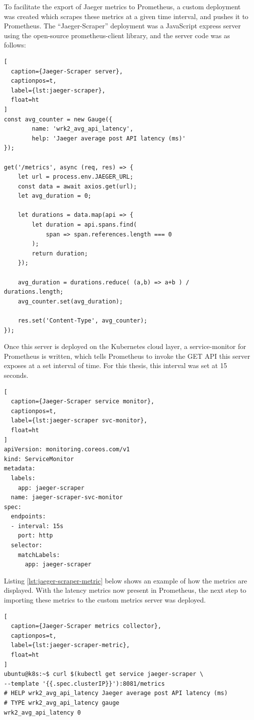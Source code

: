 To facilitate the export of Jaeger metrics to Prometheus, a custom deployment was created which scrapes these metrics at a given time interval, and pushes it to Prometheus. The ``Jaeger-Scraper'' deployment was a JavaScript express server using the open-source prometheus-client library, and the server code was as follows:

\begin{lstlisting}[
  caption={Jaeger-Scraper server},
  captionpos=t,
  label={lst:jaeger-scraper},
  float=ht
]
const avg_counter = new Gauge({
        name: 'wrk2_avg_api_latency',
        help: 'Jaeger average post API latency (ms)'
});

get('/metrics', async (req, res) => {
    let url = process.env.JAEGER_URL;
    const data = await axios.get(url);
    let avg_duration = 0;

    let durations = data.map(api => {
        let duration = api.spans.find(
            span => span.references.length === 0
        );
        return duration;
    });

    avg_duration = durations.reduce( (a,b) => a+b ) / durations.length;
    avg_counter.set(avg_duration);

    res.set('Content-Type', avg_counter);
});
\end{lstlisting}

Once this server is deployed on the Kubernetes cloud layer, a service-monitor for Prometheus is written, which tells Prometheus to invoke the GET API this server exposes at a set interval of time. For this thesis, this interval was set at 15 seconds.

\begin{lstlisting}[
  caption={Jaeger-Scraper service monitor},
  captionpos=t,
  label={lst:jaeger-scraper svc-monitor},
  float=ht
]
apiVersion: monitoring.coreos.com/v1
kind: ServiceMonitor
metadata:
  labels:
    app: jaeger-scraper
  name: jaeger-scraper-svc-monitor
spec:
  endpoints:
  - interval: 15s
    port: http
  selector:
    matchLabels:
      app: jaeger-scraper
\end{lstlisting}

Listing \ref{lst:jaeger-scraper-metric} below shows an example of how the metrics are displayed. With the latency metrics now present in Prometheus, the next step to importing these metrics to the custom metrics server was deployed.\par

\begin{lstlisting}[
  caption={Jaeger-Scraper metrics collector},
  captionpos=t,
  label={lst:jaeger-scraper-metric},
  float=ht
]
ubuntu@k8s:~$ curl $(kubectl get service jaeger-scraper \
--template '{{.spec.clusterIP}}'):8081/metrics
# HELP wrk2_avg_api_latency Jaeger average post API latency (ms)
# TYPE wrk2_avg_api_latency gauge
wrk2_avg_api_latency 0
\end{lstlisting}

